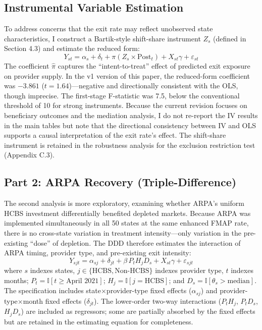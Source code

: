 \documentclass[12pt]{article}
\newcommand{\ind}{\mathbb{I}}
\begin{document}
\subsection{Instrumental Variable Estimation}

To address concerns that the exit rate may reflect unobserved state characteristics, I construct a Bartik-style shift-share instrument $Z_s$ (defined in Section 4.3) and estimate the reduced form:
\begin{equation}
Y_{st} = \alpha_s + \delta_t + \pi \left( Z_s \times \text{Post}_{t} \right) + X_{st} \gamma + \varepsilon_{st}
\end{equation}
The coefficient $\hat{\pi}$ captures the ``intent-to-treat'' effect of predicted exit exposure on provider supply. In the v1 version of this paper, the reduced-form coefficient was $-3.861$ ($t = 1.64$)---negative and directionally consistent with the OLS, though imprecise. The first-stage F-statistic was 7.5, below the conventional threshold of 10 for strong instruments. Because the current revision focuses on beneficiary outcomes and the mediation analysis, I do not re-report the IV results in the main tables but note that the directional consistency between IV and OLS supports a causal interpretation of the exit rate's effect. The shift-share instrument is retained in the robustness analysis for the exclusion restriction test (Appendix C.3).

\subsection{Part 2: ARPA Recovery (Triple-Difference)}

The second analysis is more exploratory, examining whether ARPA's uniform HCBS investment differentially benefited depleted markets. Because ARPA was implemented simultaneously in all 50 states at the same enhanced FMAP rate, there is no cross-state variation in treatment intensity---only variation in the pre-existing ``dose'' of depletion. The DDD therefore estimates the interaction of ARPA timing, provider type, and pre-existing exit intensity:
\begin{equation}
Y_{sjt} = \alpha_{sj} + \delta_{jt} + \beta \, P_{t} H_{j} D_s + X_{st} \gamma + \varepsilon_{sjt}
\label{eq:ddd}
\end{equation}
where $s$ indexes states, $j \in \{\text{HCBS}, \text{Non-HCBS}\}$ indexes provider type, $t$ indexes months; $P_t = \ind[t \geq \text{April 2021}]$; $H_j = \ind[j = \text{HCBS}]$; and $D_s = \ind[\theta_s > \text{median}]$. The specification includes state$\times$provider-type fixed effects ($\alpha_{sj}$) and provider-type$\times$month fixed effects ($\delta_{jt}$). The lower-order two-way interactions ($P_t H_j$, $P_t D_s$, $H_j D_s$) are included as regressors; some are partially absorbed by the fixed effects but are retained in the estimating equation for completeness.
\end{document}
